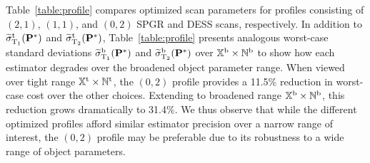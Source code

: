 Table~\ref{table:profile} compares optimized scan parameters 
for profiles consisting 
of $(2,1)$, $(1,1)$, and $(0,2)$ SPGR and DESS scans, 
respectively. 
In addition to $\widetilde{\sigma}_{\mathrm{T}_1}^\mathrm{t}(\mathbf{P}^*)$ and $\widetilde{\sigma}_{\mathrm{T}_2}^\mathrm{t}(\mathbf{P}^*)$, 
Table~\ref{table:profile} presents 
analogous worst-case standard deviations 
$\widetilde{\sigma}_{\mathrm{T}_1}^\mathrm{b}(\mathbf{P}^*)$ and $\widetilde{\sigma}_{\mathrm{T}_2}^\mathrm{b}(\mathbf{P}^*)$ 
over $\mathbb{X}^\mathrm{b} \times \mathbb{N}^\mathrm{b}$ 
to show how each estimator degrades 
over the broadened object parameter range. 
When viewed over tight range 
$\mathbb{X}^\mathrm{t} \times \mathbb{N}^\mathrm{t}$, 
the $(0,2)$ profile provides a 11.5\% reduction 
in worst-case cost over the other choices. 
Extending to broadened range $\mathbb{X}^\mathrm{b} \times \mathbb{N}^\mathrm{b}$, 
this reduction grows dramatically to 31.4\%. 
We thus observe that while the different optimized profiles 
afford similar estimator precision 
over a narrow range of interest, 
the $(0,2)$ profile may be preferable 
due to its robustness to a wide range of object parameters. 

